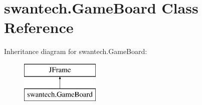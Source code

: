 \hypertarget{classswantech_1_1_game_board}{}\section{swantech.\+Game\+Board Class Reference}
\label{classswantech_1_1_game_board}
Inheritance diagram for swantech.\+Game\+Board\+:\begin{figure}[H]
\begin{center}
\leavevmode
\includegraphics[height=2.000000cm]{classswantech_1_1_game_board}
\end{center}
\end{figure}
